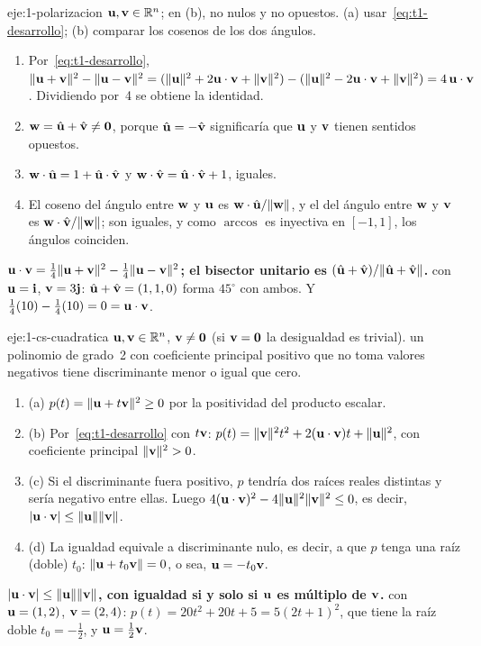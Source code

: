 \begin{solucion}{eje:1-polarizacion}
\datos $\mathbf{u},\mathbf{v}\in\mathbb{R}^n$; en (b), no nulos y no opuestos.
\planteamiento (a) usar~\eqref{eq:t1-desarrollo}; (b) comparar los cosenos de los dos ángulos.
\pasos
\begin{enumerate}[label=\arabic*.]
  \item Por~\eqref{eq:t1-desarrollo}, $\lVert\mathbf{u}+\mathbf{v}\rVert^2-\lVert\mathbf{u}-\mathbf{v}\rVert^2=(\lVert\mathbf{u}\rVert^2+2\mathbf{u}\cdot\mathbf{v}+\lVert\mathbf{v}\rVert^2)-(\lVert\mathbf{u}\rVert^2-2\mathbf{u}\cdot\mathbf{v}+\lVert\mathbf{v}\rVert^2)=4\,\mathbf{u}\cdot\mathbf{v}$. Dividiendo por~4 se obtiene la identidad.
  \item $\mathbf{w}=\hat{\mathbf{u}}+\hat{\mathbf{v}}\neq\mathbf{0}$, porque $\hat{\mathbf{u}}=-\hat{\mathbf{v}}$ significaría que $\mathbf{u}$ y $\mathbf{v}$ tienen sentidos opuestos.
  \item $\mathbf{w}\cdot\hat{\mathbf{u}}=1+\hat{\mathbf{u}}\cdot\hat{\mathbf{v}}$ y $\mathbf{w}\cdot\hat{\mathbf{v}}=\hat{\mathbf{u}}\cdot\hat{\mathbf{v}}+1$, iguales.
  \item El coseno del ángulo entre $\mathbf{w}$ y $\mathbf{u}$ es $\mathbf{w}\cdot\hat{\mathbf{u}}/\lVert\mathbf{w}\rVert$, y el del ángulo entre $\mathbf{w}$ y $\mathbf{v}$ es $\mathbf{w}\cdot\hat{\mathbf{v}}/\lVert\mathbf{w}\rVert$; son iguales, y como $\arccos$ es inyectiva en $[-1,1]$, los ángulos coinciden.
\end{enumerate}
\resultado \textbf{$\mathbf{u}\cdot\mathbf{v}=\frac14\lVert\mathbf{u}+\mathbf{v}\rVert^2-\frac14\lVert\mathbf{u}-\mathbf{v}\rVert^2$; el bisector unitario es $(\hat{\mathbf{u}}+\hat{\mathbf{v}})/\lVert\hat{\mathbf{u}}+\hat{\mathbf{v}}\rVert$.}
\comprobacion con $\mathbf{u}=\mathbf{i}$, $\mathbf{v}=3\mathbf{j}$: $\hat{\mathbf{u}}+\hat{\mathbf{v}}=(1,1,0)$ forma $45^\circ$ con ambos. Y $\frac14(10)-\frac14(10)=0=\mathbf{u}\cdot\mathbf{v}$.
\end{solucion}

\begin{solucion}{eje:1-cs-cuadratica}
\datos $\mathbf{u},\mathbf{v}\in\mathbb{R}^n$, $\mathbf{v}\neq\mathbf{0}$ (si $\mathbf{v}=\mathbf{0}$ la desigualdad es trivial).
\planteamiento un polinomio de grado~2 con coeficiente principal positivo que no toma valores negativos tiene discriminante menor o igual que cero.
\pasos
\begin{enumerate}[label=\arabic*.]
  \item (a) $p(t)=\lVert\mathbf{u}+t\mathbf{v}\rVert^2\ge0$ por la positividad del producto escalar.
  \item (b) Por~\eqref{eq:t1-desarrollo} con $t\mathbf{v}$: $p(t)=\lVert\mathbf{v}\rVert^2t^2+2(\mathbf{u}\cdot\mathbf{v})t+\lVert\mathbf{u}\rVert^2$, con coeficiente principal $\lVert\mathbf{v}\rVert^2>0$.
  \item (c) Si el discriminante fuera positivo, $p$ tendría dos raíces reales distintas y sería negativo entre ellas. Luego $4(\mathbf{u}\cdot\mathbf{v})^2-4\lVert\mathbf{u}\rVert^2\lVert\mathbf{v}\rVert^2\le0$, es decir, $\lvert\mathbf{u}\cdot\mathbf{v}\rvert\le\lVert\mathbf{u}\rVert\lVert\mathbf{v}\rVert$.
  \item (d) La igualdad equivale a discriminante nulo, es decir, a que $p$ tenga una raíz (doble) $t_0$: $\lVert\mathbf{u}+t_0\mathbf{v}\rVert=0$, o sea, $\mathbf{u}=-t_0\mathbf{v}$.
\end{enumerate}
\resultado \textbf{$\lvert\mathbf{u}\cdot\mathbf{v}\rvert\le\lVert\mathbf{u}\rVert\lVert\mathbf{v}\rVert$, con igualdad si y solo si $\mathbf{u}$ es múltiplo de $\mathbf{v}$.}
\comprobacion con $\mathbf{u}=(1,2)$, $\mathbf{v}=(2,4)$: $p(t)=20t^2+20t+5=5(2t+1)^2$, que tiene la raíz doble $t_0=-\frac12$, y $\mathbf{u}=\frac12\mathbf{v}$.
\end{solucion}


